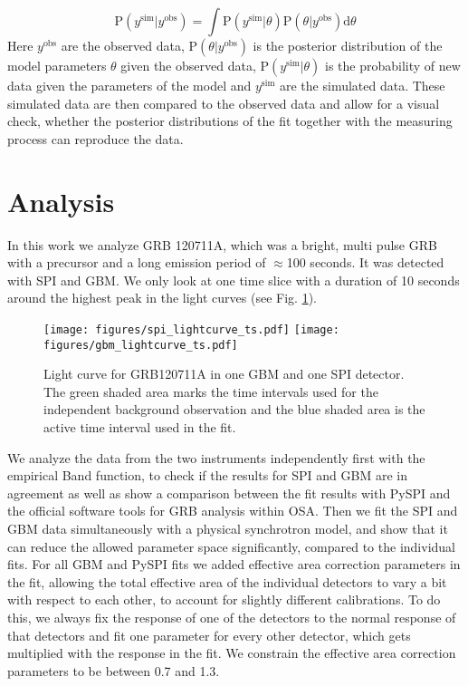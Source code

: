 \documentclass[twocolumn]{aa}
\begin{document}
\begin{equation}
  \textrm{P}(y^{\textrm{sim}}|y^{\textrm{obs}}) = \int \textrm{P}(y^{\textrm{sim}}|\theta) \textrm{P}(\theta|y^{\textrm{obs}}) \mathrm{d}\theta
  \label{eq:ppc}
\end{equation}
\noindent
Here $y^{\textrm{obs}}$ are the observed data, $\textrm{P}(\theta|y^{\textrm{obs}})$ is the posterior distribution of the model parameters $\theta$ given the observed data, $\textrm{P}(y^{\textrm{sim}}|\theta)$ is the probability of new data given the parameters of the model and $y^{\textrm{sim}}$ are the simulated data. These simulated data are then compared to the observed data and allow for a visual check, whether the posterior distributions of the fit together with the measuring process can reproduce the data.
\section{Analysis}

In this work we analyze GRB 120711A, which was a bright, multi pulse GRB with a precursor and a long emission period of $\approx$100 seconds. It was detected with SPI and GBM. We only look at one time slice with a duration of 10 seconds around the highest peak in the light curves (see Fig. \ref{fig:time_selection}).

\begin{figure}
  \begin{centering}
    \texttt{[image: figures/spi\_lightcurve\_ts.pdf]}
    \texttt{[image: figures/gbm\_lightcurve\_ts.pdf]}
    \caption{Light curve for GRB120711A in one GBM and one SPI detector. The green shaded area marks the time intervals used for the independent background observation and the blue shaded area is the active time interval used in the fit.}
    \label{fig:time_selection}
  \end{centering}
\end{figure}


We analyze the data from the two instruments independently first with the empirical Band function, to check if the results for SPI and GBM are in agreement as well as show a comparison between the fit results with PySPI and the official software tools for GRB analysis within OSA. Then we fit the SPI and GBM data simultaneously with a physical synchrotron model, and show that it can reduce the allowed parameter space significantly, compared to the individual fits. For all GBM and PySPI fits we added effective area correction parameters in the fit, allowing the total effective area of the individual detectors to vary a bit with respect to each other, to account for slightly different calibrations. To do this, we always fix the response of one of the detectors to the normal response of that detectors and fit one parameter for every other detector, which gets multiplied with the response in the fit. We constrain the effective area correction parameters to be between 0.7 and 1.3.
\end{document}
